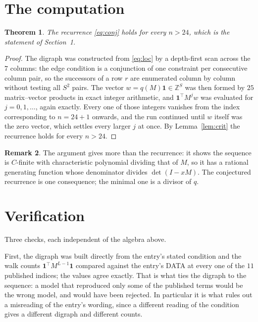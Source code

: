 \documentclass[11pt,a4paper]{article}
\theoremstyle{plain}
\newtheorem{theorem}{Theorem}
\theoremstyle{definition}
\newtheorem{remark}[theorem]{Remark}
\begin{document}
\section{The computation}

\begin{theorem}
The recurrence \eqref{eq:conj} holds for every $n>24$, which is the statement of
Section~1.
\end{theorem}

\begin{proof}
The digraph was constructed from \eqref{eq:loc} by a depth-first scan across the $7$
columns: the edge condition is a conjunction of one constraint per consecutive column
pair, so the successors of a row $r$ are enumerated column by column without testing all
$S^2$ pairs. The vector $w=q(M)\mathbf{1}\in\mathbb{Z}^{S}$ was then formed by $25$
matrix--vector products in exact integer arithmetic, and $\mathbf{1}^{\!\top}M^{j}w$ was
evaluated for $j=0,1,\dots$, again exactly. Every one of those integers vanishes from the
index corresponding to $n=24+1$ onwards, and the run continued until $w$ itself was the
zero vector, which settles every larger $j$ at once. By Lemma~\ref{lem:crit} the recurrence
holds for every $n>24$.
\end{proof}

\begin{remark}
The argument gives more than the recurrence: it shows the sequence is $C$-finite with
characteristic polynomial dividing that of $M$, so it has a rational generating function
whose denominator divides $\det(I-xM)$. The conjectured recurrence is one consequence; the
minimal one is a divisor of $q$.
\end{remark}

\section{Verification}

Three checks, each independent of the algebra above.

First, the digraph was built directly from the entry's stated condition and the walk counts
$\mathbf{1}^{\!\top}M^{L-1}\mathbf{1}$ compared against the entry's DATA at
every one of the $11$ published indices; the values agree exactly. That is what ties
the digraph to the sequence: a model that reproduced only some of the published terms would
be the wrong model, and would have been rejected. In particular it is what rules out a
misreading of the entry's wording, since a different reading of the condition gives a
different digraph and different counts.
\end{document}
